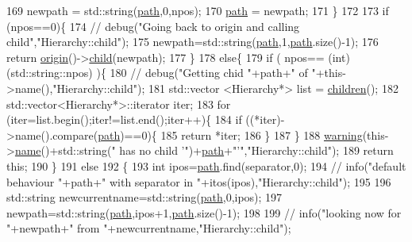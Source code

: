 \begin{DoxyCode}
169     newpath = std::string(\hyperlink{classHierarchy_aa7990fa7caf132d83e361ce033c6c65a}{path},0,npos);
170     \hyperlink{classHierarchy_aa7990fa7caf132d83e361ce033c6c65a}{path} = newpath;
171   \}
172 
173   \textcolor{keywordflow}{if} (npos==0)\{
174     \textcolor{comment}{//    debug("Going back to origin and calling child","Hierarchy::child");}
175     newpath=std::string(\hyperlink{classHierarchy_aa7990fa7caf132d83e361ce033c6c65a}{path},1,\hyperlink{classHierarchy_aa7990fa7caf132d83e361ce033c6c65a}{path}.size()-1);
176     \textcolor{keywordflow}{return} \hyperlink{classHierarchy_aee461dc930ce3871636ff87f075b1b83}{origin}()->\hyperlink{classHierarchy_a1e207f973c694b538bf90107b4868817}{child}(newpath);
177   \}
178   \textcolor{keywordflow}{else}\{
179     \textcolor{keywordflow}{if} ( npos== (\textcolor{keywordtype}{int})(std::string::npos) )\{
180       \textcolor{comment}{//      debug("Getting chid "+path+" of "+this->name(),"Hierarchy::child");}
181       std::vector <Hierarchy*> list = \hyperlink{classHierarchy_aa9a76f69e98e052ee1a6e32cea006288}{children}();
182       std::vector<Hierarchy*>::iterator iter;
183       \textcolor{keywordflow}{for} (iter=list.begin();iter!=list.end();iter++)\{
184         \textcolor{keywordflow}{if} ((*iter)->name().compare(\hyperlink{classHierarchy_aa7990fa7caf132d83e361ce033c6c65a}{path})==0)\{
185           \textcolor{keywordflow}{return} *iter;
186         \}
187       \}
188       \hyperlink{classObject_a65cd4fda577711660821fd2cd5a3b4c9}{warning}(this->\hyperlink{classObject_a300f4c05dd468c7bb8b3c968868443c1}{name}()+std::string(\textcolor{stringliteral}{" has no child '"})+\hyperlink{classHierarchy_aa7990fa7caf132d83e361ce033c6c65a}{path}+\textcolor{stringliteral}{"'"},\textcolor{stringliteral}{"Hierarchy::child"});
189       \textcolor{keywordflow}{return} \textcolor{keyword}{this};
190     \}
191     \textcolor{keywordflow}{else}
192     \{
193       \textcolor{keywordtype}{int} ipos=\hyperlink{classHierarchy_aa7990fa7caf132d83e361ce033c6c65a}{path}.find(separator,0);
194       \textcolor{comment}{//      info("default behaviour "+path+" with separator in "+itos(ipos),"Hierarchy::child");}
195 
196       std::string newcurrentname=std::string(\hyperlink{classHierarchy_aa7990fa7caf132d83e361ce033c6c65a}{path},0,ipos);
197       newpath=std::string(\hyperlink{classHierarchy_aa7990fa7caf132d83e361ce033c6c65a}{path},ipos+1,\hyperlink{classHierarchy_aa7990fa7caf132d83e361ce033c6c65a}{path}.size()-1);
198 
199       \textcolor{comment}{//      info("looking now for "+newpath+" from "+newcurrentname,"Hierarchy::child");}

\end{DoxyCode}
